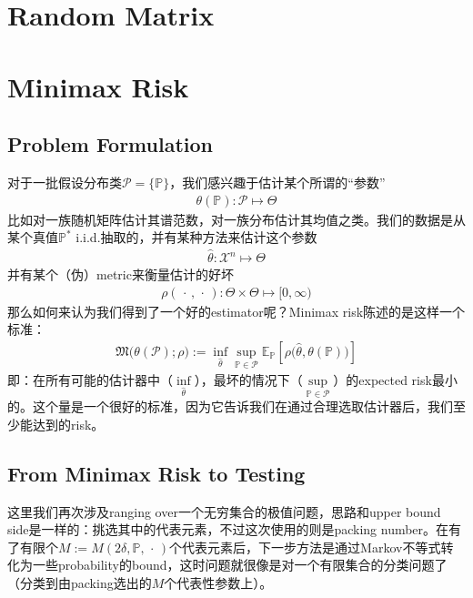 \documentclass[11pt,a4paper]{ctexart}
\numberwithin{equation}{section}%
\begin{document}
\section{Random Matrix}















\section{Minimax Risk}

\subsection{Problem Formulation}
对于一批假设分布类$ \mathcal{P}=\{\mathbb{P}\} $，我们感兴趣于估计某个所谓的“参数”
\begin{align*}
    \theta(\mathbb{P}) : \mathcal{P}\mapsto \Theta
\end{align*}
比如对一族随机矩阵估计其谱范数，对一族分布估计其均值之类。我们的数据是从某个真值$ \mathbb{P}^* $ i.i.d.抽取的，并有某种方法来估计这个参数
\begin{align*}
    \hat{\theta} : \mathcal{X}^n\mapsto \Theta
\end{align*}
并有某个（伪）metric来衡量估计的好坏
\begin{align*}
    \rho (\, \cdot \, ,\, \cdot \, ) : \Theta\times \Theta \mapsto [0,\infty )
\end{align*}
那么如何来认为我们得到了一个好的estimator呢？Minimax risk陈述的是这样一个标准：
\begin{align*}
    \mathfrak{M}\big(\theta (\mathcal{P});\rho \big)  := \mathop{ \inf  }\limits_{\hat{\theta }} \mathop{ \sup  }\limits_{\mathbb{P}\in \mathcal{P}} \mathbb{E}_\mathbb{P}\left[ \rho \bigl(\hat{\theta }, \theta (\mathbb{P})\bigr) \right]   
\end{align*}
即：在所有可能的估计器中（$ \mathop{ \inf  }\limits_{\hat{\theta }} $），最坏的情况下（$ \mathop{ \sup  }\limits_{\mathbb{P}\in \mathcal{P}}  $）的expected risk最小的。这个量是一个很好的标准，因为它告诉我们在通过合理选取估计器后，我们至少能达到的risk。


\subsection{From Minimax Risk to Testing}
这里我们再次涉及ranging over一个无穷集合的极值问题，思路和upper bound side是一样的：挑选其中的代表元素，不过这次使用的则是packing number。在有了有限个$ M:=M(2\delta , \mathbb{P}, \, \cdot \, ) $个代表元素后，下一步方法是通过Markov不等式转化为一些probability的bound，这时问题就很像是对一个有限集合的分类问题了（分类到由packing选出的$ M $个代表性参数上）。
\end{document}
